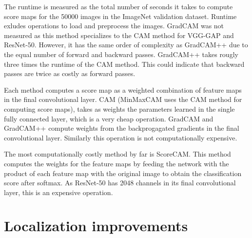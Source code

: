 The runtime is measured as the total number of seconds it takes to compute score maps for the 50000 images in the ImageNet validation dataset. Runtime exludes operations to load and preprocess the images. GradCAM was not measured as this method specializes to the CAM method for VGG-GAP and ResNet-50. However, it has the same order of complexity as GradCAM++ due to the equal number of forward and backward passes. GradCAM++ takes rougly three times the runtime of the CAM method. This could indicate that backward passes are twice as costly as forward passes.

Each method computes a score map as a weighted combination of feature maps in the final convolutional layer. CAM (MinMaxCAM uses the CAM method for computing score maps), takes as weights the parameters learned in the single fully connected layer, which is a very cheap operation. GradCAM and GradCAM++ compute weights from the backprogagated gradients in the final convolutional layer. Similarly this operation is not computationally expensive.

The most computationally costly method by far is ScoreCAM. This method computes the weights for the feature maps by feeding the network with the product of each feature map with the original image to obtain the classification score after softmax. As ResNet-50 has 2048 channels in its final convolutional layer, this is an expensive operation.

\section{Localization improvements}
